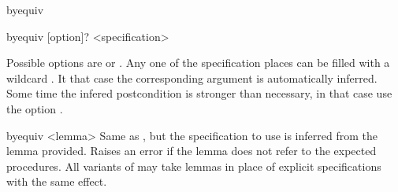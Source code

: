 \begin{tactic}{byequiv}
\begin{tsyntax}{byequiv [option]? <specification>}
 \end{tsyntax}

  Possible options are  or .
  Any one of the specification places can be filled
  with a wildcard \tct{_}. It that case the corresponding argument 
  is automatically inferred. Some time the infered postcondition  
  is stronger than necessary, in that case use the option .
  
  \begin{tsyntax}{byequiv <lemma>}
  Same as , but the specification to use is 
  inferred from the lemma provided. Raises an error if the lemma does 
  not refer to the expected procedures. All variants of  
  may take lemmas in place of explicit specifications with the same effect.
  \end{tsyntax}


\end{tactic}
